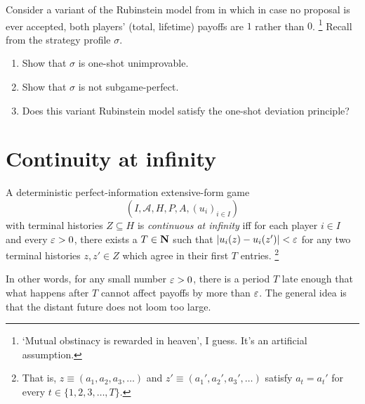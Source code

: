 \begin{exercise}
	\label{exercise:rubinstein_non-osdp}
	Consider a variant of the Rubinstein model from  in which in case no proposal is ever accepted, both players' (total, lifetime) payoffs are $1$ rather than $0$.%
		\footnote{`Mutual obstinacy is rewarded in heaven', I guess. It's an artificial assumption.}
	Recall from  the strategy profile $\sigma$.

	\begin{enumerate}[label=(\alph*)]

		\item Show that $\sigma$ is one-shot unimprovable.

		\item Show that $\sigma$ is not subgame-perfect.

		\item Does this variant Rubinstein model satisfy the one-shot deviation principle?
	
	\end{enumerate}
\end{exercise}



\section{Continuity at infinity}
\label{osdp:valid}

\begin{definition}
	\label{definition:conts_at_infty}
	A deterministic perfect-information extensive-form game
	\begin{equation*}
		(I,\mathcal{A},H,P,A,(u_i)_{i \in I}) 
	\end{equation*}
	with terminal histories $Z \subseteq H$ is \emph{continuous at infinity} iff for each player $i \in I$ and every $\varepsilon>0$, there exists a $T \in \mathbf{N}$ such that $\abs*{ u_i(z) - u_i(z') } < \eps$ for any two terminal histories $z,z' \in Z$ which agree in their first $T$ entries.%
		\footnote{That is, $z \equiv (a_1,a_2,a_3,\dots)$ and $z' \equiv (a_1',a_2',a_3',\dots)$ satisfy $a_t=a_t'$ for every $t \in \{1,2,3,\dots,T\}$.}
\end{definition}

In other words, for any small number $\varepsilon>0$, there is a period $T$ late enough that what happens after $T$ cannot affect payoffs by more than $\varepsilon$. The general idea is that the distant future does not loom too large.


